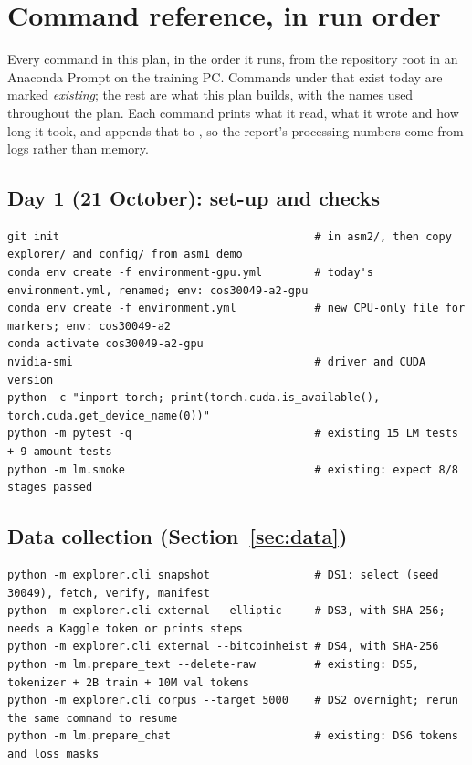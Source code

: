 \section{Command reference, in run order}
\label{app:commands}

Every command in this plan, in the order it runs, from the repository root in an Anaconda Prompt
on the training PC. Commands under  that exist today are marked \emph{existing}; the
rest are what this plan builds, with the names used throughout the plan. Each 
command prints what it read, what it wrote and how long it took, and appends that to
, so the report's processing numbers come from logs rather than
memory.

\subsection{Day 1 (21 October): set-up and checks}

\begin{lstlisting}
git init                                       # in asm2/, then copy explorer/ and config/ from asm1_demo
conda env create -f environment-gpu.yml        # today's environment.yml, renamed; env: cos30049-a2-gpu
conda env create -f environment.yml            # new CPU-only file for markers; env: cos30049-a2
conda activate cos30049-a2-gpu
nvidia-smi                                     # driver and CUDA version
python -c "import torch; print(torch.cuda.is_available(), torch.cuda.get_device_name(0))"
python -m pytest -q                            # existing 15 LM tests + 9 amount tests
python -m lm.smoke                             # existing: expect 8/8 stages passed
\end{lstlisting}

\subsection{Data collection (Section~\ref{sec:data})}

\begin{lstlisting}
python -m explorer.cli snapshot                # DS1: select (seed 30049), fetch, verify, manifest
python -m explorer.cli external --elliptic     # DS3, with SHA-256; needs a Kaggle token or prints steps
python -m explorer.cli external --bitcoinheist # DS4, with SHA-256
python -m lm.prepare_text --delete-raw         # existing: DS5, tokenizer + 2B train + 10M val tokens
python -m explorer.cli corpus --target 5000    # DS2 overnight; rerun the same command to resume
python -m lm.prepare_chat                      # existing: DS6 tokens and loss masks
\end{lstlisting}

